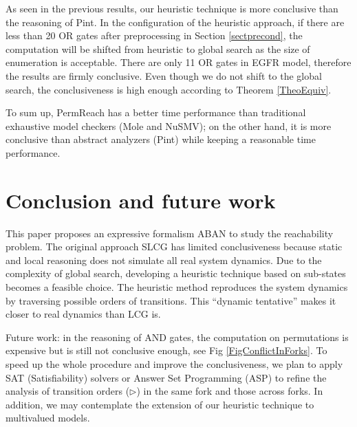 \documentclass[runningheads]{llncs}
\begin{document}
As seen in the previous results, our heuristic technique is more conclusive than the reasoning of Pint. 
In the configuration of the heuristic approach, if there are less than 20 OR gates after preprocessing in Section \ref{sectprecond}, the computation will be shifted from heuristic to global search as the size of enumeration is acceptable.
There are only 11 OR gates in EGFR model, therefore the results are firmly conclusive. 
Even though we do not shift to the global search, the conclusiveness is high enough according to Theorem \ref{TheoEquiv}.

To sum up, PermReach has a better time performance than traditional exhaustive model checkers (Mole and NuSMV); on the other hand, it is more conclusive than abstract analyzers (Pint) while keeping a reasonable time performance.

\section{Conclusion and future work}\label{sect:6}
This paper proposes an expressive formalism ABAN to study the reachability problem. 
The original approach SLCG has limited conclusiveness because static and local reasoning does not simulate all real system dynamics. 
Due to the complexity of global search, developing a heuristic technique based on sub-states becomes a feasible choice.
The heuristic method reproduces the system dynamics by traversing possible orders of transitions. 
This ``dynamic tentative'' makes it closer to real dynamics than LCG is.

Future work: in the reasoning of AND gates, the computation on permutations is expensive but is still not conclusive enough, see Fig \ref{FigConflictInForks}. 
To speed up the whole procedure and improve the conclusiveness, we plan to apply SAT (Satisfiability) solvers or Answer Set Programming (ASP) to refine the analysis of transition orders ($\triangleright$) in the same fork and those across forks. 
In addition, we may contemplate the extension of our heuristic technique to multivalued models.
\appendix
\end{document}
